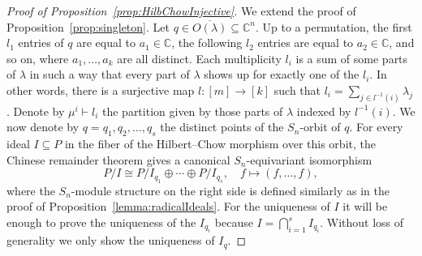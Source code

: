 \documentclass[11pt]{amsart}
\theoremstyle{definition}
\newcommand{\CC}{\mathbb{C}}
\begin{document}
\begin{proof}[Proof of Proposition~\ref{prop:HilbChowInjective}]
    We extend the proof of Proposition~\ref{prop:singleton}. Let $q \in \overline{O(\lambda)} \subseteq \CC^n$. Up to a permutation, the first $l_1$ entries of $q$ are equal to $a_1 \in \CC$, the following $l_2$ entries are equal to $a_2 \in \CC$, and so on, where $a_1, \ldots, a_k$ are all distinct. Each multiplicity $l_i$ is a sum of some parts of $\lambda$ in such a way that every part of $\lambda$ shows up for exactly one of the $l_i$. In other words, there is a surjective map $l:[m] \rightarrow [k]$ such that $l_i = \sum_{j \in l^{-1}(i)} \lambda_j$. Denote by $\mu^i \vdash l_i$ the partition given by those parts of $\lambda$ indexed by $l^{-1}(i)$. We now denote by $q = q_1, q_2, \ldots, q_{s}$ the distinct points of the $S_n$-orbit of $q$. For every ideal $I \subseteq P$ in the fiber of the Hilbert--Chow morphism over this orbit, the Chinese remainder theorem gives a canonical $S_n$-equivariant isomorphism
    \begin{equation*}
        P/I \cong P/I_{q_1} \oplus \cdots \oplus P/I_{q_{s}}, \quad f \mapsto (f, \ldots, f),
    \end{equation*}
    where the $S_n$-module structure on the right side is defined similarly as in the proof of Proposition~\ref{lemma:radicalIdeals}. For the uniqueness of $I$ it will be enough to prove the uniqueness of the $I_{q_i}$ because $I = \bigcap_{i=1}^{s} I_{q_i}$. Without loss of generality we only show the uniqueness of $I_{q}$.
    

\end{proof}
\end{document}
